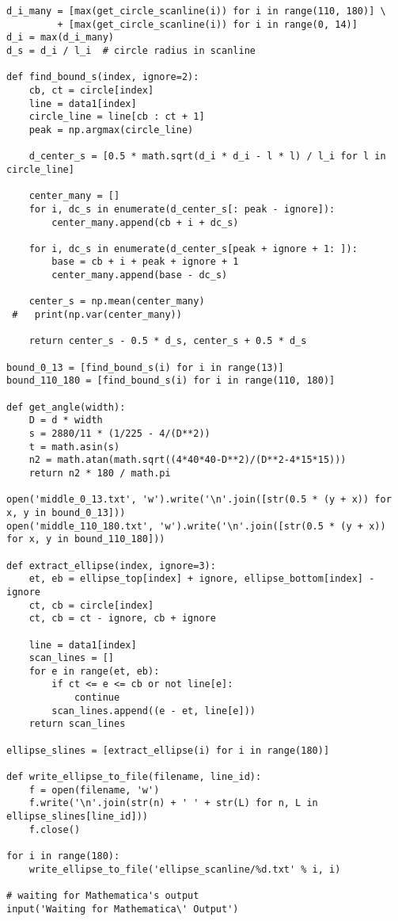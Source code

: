 \begin{verbatim}
d_i_many = [max(get_circle_scanline(i)) for i in range(110, 180)] \
         + [max(get_circle_scanline(i)) for i in range(0, 14)]
d_i = max(d_i_many)
d_s = d_i / l_i  # circle radius in scanline

def find_bound_s(index, ignore=2):
    cb, ct = circle[index]
    line = data1[index]
    circle_line = line[cb : ct + 1]
    peak = np.argmax(circle_line)

    d_center_s = [0.5 * math.sqrt(d_i * d_i - l * l) / l_i for l in circle_line]

    center_many = []
    for i, dc_s in enumerate(d_center_s[: peak - ignore]):
        center_many.append(cb + i + dc_s)

    for i, dc_s in enumerate(d_center_s[peak + ignore + 1: ]):
        base = cb + i + peak + ignore + 1
        center_many.append(base - dc_s)

    center_s = np.mean(center_many)
 #   print(np.var(center_many))

    return center_s - 0.5 * d_s, center_s + 0.5 * d_s

bound_0_13 = [find_bound_s(i) for i in range(13)]
bound_110_180 = [find_bound_s(i) for i in range(110, 180)]

def get_angle(width):
    D = d * width
    s = 2880/11 * (1/225 - 4/(D**2))
    t = math.asin(s)
    n2 = math.atan(math.sqrt((4*40*40-D**2)/(D**2-4*15*15)))
    return n2 * 180 / math.pi

open('middle_0_13.txt', 'w').write('\n'.join([str(0.5 * (y + x)) for x, y in bound_0_13]))
open('middle_110_180.txt', 'w').write('\n'.join([str(0.5 * (y + x)) for x, y in bound_110_180]))

def extract_ellipse(index, ignore=3):
    et, eb = ellipse_top[index] + ignore, ellipse_bottom[index] - ignore
    ct, cb = circle[index]
    ct, cb = ct - ignore, cb + ignore

    line = data1[index]
    scan_lines = []
    for e in range(et, eb):
        if ct <= e <= cb or not line[e]:
            continue
        scan_lines.append((e - et, line[e]))
    return scan_lines

ellipse_slines = [extract_ellipse(i) for i in range(180)]

def write_ellipse_to_file(filename, line_id):
    f = open(filename, 'w')
    f.write('\n'.join(str(n) + ' ' + str(L) for n, L in ellipse_slines[line_id]))
    f.close()

for i in range(180):
    write_ellipse_to_file('ellipse_scanline/%d.txt' % i, i)

# waiting for Mathematica's output
input('Waiting for Mathematica\' Output')
\end{verbatim} 



